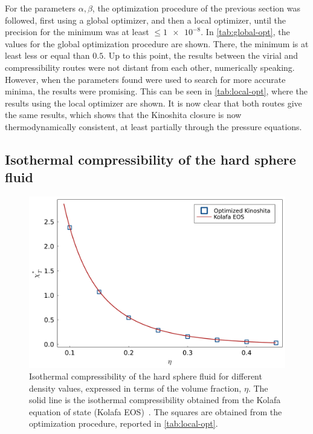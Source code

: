For the parameters \(\alpha, \beta\), the optimization procedure of the previous section 
was followed, first using a global optimizer, and then a local optimizer, until the 
precision for the minimum was at least \(\leq \num{1e-8} .\) 
In \autoref{tab:global-opt}, the values for the global optimization procedure are shown. 
There, the minimum is at least less or equal than \(0.5\). 
Up to this point, the results between the virial and compressibility routes were not distant 
from each other, numerically speaking. However, when the parameters found were used to 
search for more accurate minima, the results were promising. This can be seen in 
\autoref{tab:local-opt}, where the results using the local optimizer are shown. It is now 
clear that both routes give the same results, which shows that the Kinoshita closure is now 
thermodynamically consistent, at least partially through the pressure equations.

\subsection{Isothermal compressibility of the hard sphere fluid}
\begin{figure}
    \centering
    \includegraphics[scale=0.32]{figuras/capitulo-5/chi-eta.pdf}
    \caption{Isothermal compressibility of the hard sphere fluid for different density values, expressed in terms of the volume fraction, \(\eta .\) The solid line is the isothermal compressibility obtained from the Kolafa equation of state (Kolafa EOS)~\cite{kolafaAccurateEquationState2004}. The squares are obtained from the optimization procedure, reported in \autoref{tab:local-opt}.}
    \label{fig:isothermal-results}
\end{figure}

